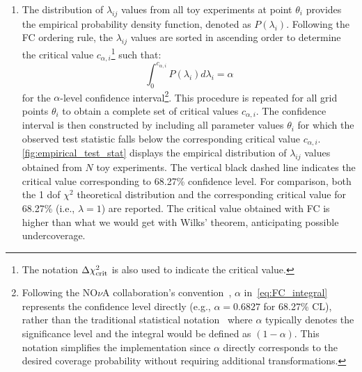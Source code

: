 \begin{enumerate}
\begin{itemize}
    \end{itemize}
\autoref{fig:teststat_FC_profile} shows the $\chi^2$ profile for a single pseudoexperiment $t_{ij}$, where the blue curve represents the full profile, the purple star indicates $\chi^2(t_{ij}|\theta_i, \hat{\hat{\bm{\eta}_{ij}}})$, and the green star shows $\chi^2(t_{ij}|\hat{\theta}_j, \hat{\bm{\eta}}_j)$ at the global minimum. The test statistic $\lambda{ij}$ is calculated as the difference between these two values.
\item The distribution of $\lambda_{ij}$ values from all toy experiments at point $\theta_i$ provides the empirical probability density function, denoted as $P(\lambda_i)$.  Following the FC ordering rule, the $\lambda_{ij}$ values are sorted in ascending order to determine the critical value $c_{\alpha,i}$\footnote{The notation $\Delta \chi^2_{\rm crit}$ is also used to indicate the critical value.} such that:
\begin{equation}\label{eq:FC_integral}
\int_0^{c_{\alpha,i}} P(\lambda_i) d\lambda_i = \alpha
\end{equation}
for the $\alpha$-level confidence interval\footnote{Following the NO$\nu$A collaboration's convention~\cite{NOvA:2022wnj}, $\alpha$ in~\autoref{eq:FC_integral} represents the confidence level directly (e.g., $\alpha = 0.6827$ for 68.27\% CL), rather than the traditional statistical notation~\cite{Feldman_1998} where $\alpha$ typically denotes the significance level and the integral would be defined as $(1-\alpha)$. This notation simplifies the implementation since $\alpha$ directly corresponds to the desired coverage probability without requiring additional transformations.}. This procedure is repeated for all 
grid points $\theta_i$ to obtain a complete set of critical values $c_{\alpha,i}$.
The confidence interval is then constructed by including all parameter values 
$\theta_i$ for which the observed test statistic falls below the corresponding 
critical value $c_{\alpha,i}$. \autoref{fig:empirical_test_stat} displays the 
empirical distribution of $\lambda_{ij}$ values obtained from $N$ toy experiments. 
The vertical black dashed line indicates the critical value corresponding to 68.27\% 
confidence level. For comparison, both the 1 dof $\chi^2$ theoretical distribution and the corresponding critical value for 68.27\%  (i.e., $\lambda = 1$) are reported. The critical value obtained with FC is higher than what we would get with Wilks' theorem, anticipating possible undercoverage.
\end{enumerate}

